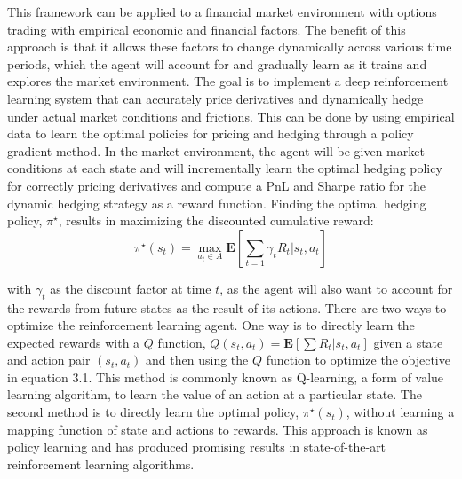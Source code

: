 \noindent This framework can be applied to a financial market environment with options trading with empirical economic and financial factors. The benefit of this approach is that it allows these factors to change dynamically across various time periods, which the agent will account for and gradually learn as it trains and explores the market environment. The goal is to implement a deep reinforcement learning system that can accurately price derivatives and dynamically hedge under actual market conditions and frictions. This can be done by using empirical data to learn the optimal policies for pricing and hedging through a policy gradient method. In the market environment, the agent will be given market conditions at each state and will incrementally learn the optimal hedging policy for correctly pricing derivatives and compute a PnL and Sharpe ratio for the dynamic hedging strategy as a reward function. Finding the optimal hedging policy, $\pi^\star$, results in maximizing the discounted cumulative reward:
\begin{equation}
    \pi^\star(s_t) = \max_{a_t \in A}{\mathbf{E}[\sum_{t=1}\gamma_tR_t|s_t, a_t]}
\end{equation}

\noindent with $\gamma_t$ as the discount factor at time $t$, as the agent will also want to account for the rewards from future states as the result of its actions. There are two ways to optimize the reinforcement learning agent. One way is to directly learn the expected rewards with a $Q$ function, $Q(s_t, a_t)=\mathbf{E}[\sum R_t|s_t, a_t]$ given a state and action pair $(s_t, a_t)$ and then using the $Q$ function to optimize the objective in equation 3.1. This method is commonly known as Q-learning, a form of value learning algorithm, to learn the value of an action at a particular state. The second method is to directly learn the optimal policy, $\pi^\star(s_t)$, without learning a mapping function of state and actions to rewards. This approach is known as policy learning and has produced promising results in state-of-the-art reinforcement learning algorithms.

